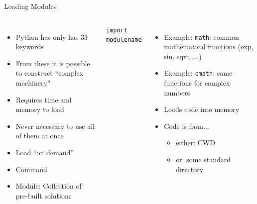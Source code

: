 \begin{frame}[fragile]{Loading Modules}
%
\begin{columns}[t]
\begin{itemize}
\item Python has only has 33 keywords
\item From these it is possible to construct \enquote{complex machinery}
\item Requires time and memory to load
\item Never necessary to use all of them at once
\item[\Thus] Load \enquote{on demand}
\item[\Thus] Command 
\item Module: Collection of pre-built solutions
\end{itemize}
%
\vspace{-6pt}
\begin{codebox}
\begin{verbatim}
import modulename
\end{verbatim}
\end{codebox}
\begin{itemize}
\item Example: \texttt{math}: common mathematical functions (exp, sin, sqrt, ...)
\item Example: \texttt{cmath}: same functions for complex numbers
\item Loads code into memory
\item Code is from...
	\begin{itemize}
	\item either: CWD
	\item or: some standard directory
	\end{itemize}
\end{itemize}
\end{columns}
%
\end{frame}


